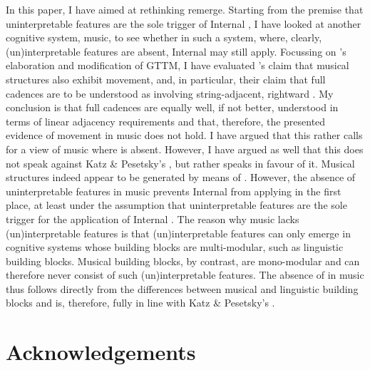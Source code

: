 \documentclass[output=paper]{langsci/langscibook}
\begin{document}
In this paper, I have aimed at rethinking remerge. Starting from the premise
that uninterpretable features are the sole trigger of Internal , I
have looked at another cognitive system, music, to see whether in such a
system, where, clearly, (un)interpretable features are absent, Internal
 may still apply. Focussing on \citeauthor{KatzPes2011}’s
elaboration and modification of  \glsdesc{GTTM}, I have
evaluated \citeauthor{KatzPes2011}’s claim that musical structures also exhibit
movement, and, in particular, their claim that full cadences are to be
understood as involving string-adjacent, rightward . My conclusion
is that full cadences are equally well, if not better, understood in terms of
linear adjacency requirements and that, therefore, the presented evidence of
movement in music does not hold. I have argued that this rather calls for a
view of music where  is absent. However, I have argued as well that
this does not speak against Katz \& Pesetsky's , but rather speaks in favour of it. Musical structures
indeed appear to be generated by means of . However, the absence of
uninterpretable features in music prevents Internal  from applying
in the first place, at least under the assumption that uninterpretable features
are the sole trigger for the application of Internal . The reason
why music lacks (un)interpretable features is that (un)interpretable features
can only emerge in cognitive systems whose building blocks are multi-modular,
such as linguistic building blocks. Musical building blocks, by contrast, are
mono-modular and can therefore never consist of such (un)interpretable
features. The absence of  in music thus follows directly from the
differences between musical and linguistic building blocks and is, therefore,
fully in line with Katz \& Pesetsky's .

\printchapterglossary{}

\section*{Acknowledgements}
\end{document}
